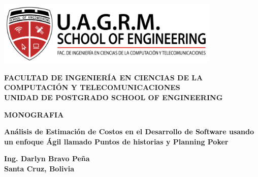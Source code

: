 \begin{titlepage}
    \begin{center}
        \includegraphics[width=0.8\textwidth]{images/logo_soe.png} \\
        \vspace{1cm}

        {\fontsize{18pt}{10pt}\selectfont\textbf{FACULTAD DE INGENIERÍA EN CIENCIAS DE LA COMPUTACIÓN Y TELECOMUNICACIONES}} \\
        \vspace{2cm}
        {\fontsize{18pt}{5pt}\selectfont\textbf{UNIDAD DE POSTGRADO SCHOOL OF ENGINEERING}} \\
        \vspace{0.5cm}
        
        \vspace{0.5cm}
        {\fontsize{20pt}{5pt}\selectfont\textbf{MONOGRAFIA}} \\
        \vspace{1cm}
        
        {\fontsize{16pt}{5pt}\selectfont\textbf{Análisis de Estimación de Costos en el Desarrollo de Software usando un enfoque Ágil llamado Puntos de historias y Planning Poker}} \\
        \vspace{1cm}
        
        \vspace{2cm}
        {\fontsize{14pt}{22pt}\selectfont\textbf{Ing. Darlyn Bravo Peña}} \\
        
        \vfill
        \textbf{Santa Cruz, Bolivia} \\
    \end{center}
    \end{titlepage}
    